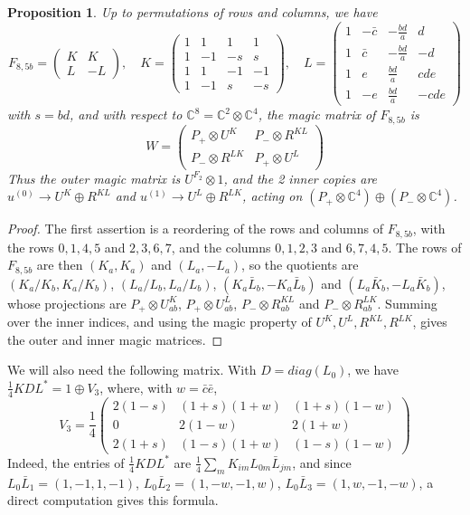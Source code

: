 \documentclass[11pt]{amsart}
\newtheorem{proposition}[theorem]{Proposition}
\begin{document}
\begin{proposition}\label{prop:f85b}
Up to permutations of rows and columns, we have
$$F_{8,5b}=\begin{pmatrix}K&K\\ L&-L\end{pmatrix},\quad K=\begin{pmatrix}1&1&1&1\\ 1&-1&-s&s\\ 1&1&-1&-1\\ 1&-1&s&-s\end{pmatrix},\quad L=\begin{pmatrix}1&-\bar{c}&-\frac{bd}{a}&d\\ 1&\bar{c}&-\frac{bd}{a}&-d\\ 1&e&\frac{bd}{a}&cde\\ 1&-e&\frac{bd}{a}&-cde\end{pmatrix}$$
with $s=bd$, and with respect to $\mathbb C^8=\mathbb C^2\otimes\mathbb C^4$, the magic matrix of $F_{8,5b}$ is
$$W=\begin{pmatrix}P_+\otimes U^K&P_-\otimes R^{KL}\\ P_-\otimes R^{LK}&P_+\otimes U^L\end{pmatrix}$$
Thus the outer magic matrix is $U^{F_2}\otimes1$, and the 2 inner copies are $u^{(0)}\to U^K\oplus R^{KL}$ and $u^{(1)}\to U^L\oplus R^{LK}$, acting on $(P_+\otimes\mathbb C^4)\oplus(P_-\otimes\mathbb C^4)$.
\end{proposition}

\begin{proof}
The first assertion is a reordering of the rows and columns of $F_{8,5b}$, with the rows $0,1,4,5$ and $2,3,6,7$, and the columns $0,1,2,3$ and $6,7,4,5$. The rows of $F_{8,5b}$ are then $(K_a,K_a)$ and $(L_a,-L_a)$, so the quotients are $(K_a/K_b,K_a/K_b)$, $(L_a/L_b,L_a/L_b)$, $(K_a\bar{L}_b,-K_a\bar{L}_b)$ and $(L_a\bar{K}_b,-L_a\bar{K}_b)$, whose projections are $P_+\otimes U^K_{ab}$, $P_+\otimes U^L_{ab}$, $P_-\otimes R^{KL}_{ab}$ and $P_-\otimes R^{LK}_{ab}$. Summing over the inner indices, and using the magic property of $U^K,U^L,R^{KL},R^{LK}$, gives the outer and inner magic matrices.
\end{proof}

\noindent We will also need the following matrix. With $D=diag(L_0)$, we have $\frac{1}{4}KDL^*=1\oplus V_3$, where, with $w=\bar{c}\bar{e}$,
$$V_3=\frac{1}{4}\begin{pmatrix}2(1-s)&(1+s)(1+w)&(1+s)(1-w)\\ 0&2(1-w)&2(1+w)\\ 2(1+s)&(1-s)(1+w)&(1-s)(1-w)\end{pmatrix}$$
Indeed, the entries of $\frac{1}{4}KDL^*$ are $\frac{1}{4}\sum_mK_{im}L_{0m}\bar{L}_{jm}$, and since $L_0\bar{L}_1=(1,-1,1,-1)$, $L_0\bar{L}_2=(1,-w,-1,w)$, $L_0\bar{L}_3=(1,w,-1,-w)$, a direct computation gives this formula.
\end{document}
